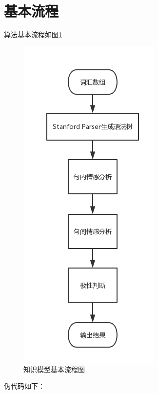 \section{基本流程}
算法基本流程如图\ref{plainmodel1}\par
\begin{figure}
\begin{center}
\includegraphics {graphic/plainmodel1.png}
\caption{知识模型基本流程图 \label{plainmodel1}}
\end{center}
\end{figure}
伪代码如下：\par
\lstset{language=python}
